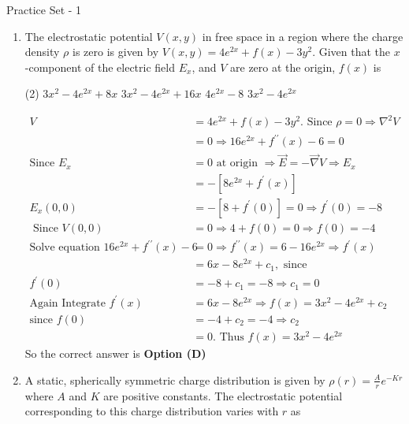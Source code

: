 \begin{abox}
Practice Set - 1
\end{abox}
\begin{enumerate}
	\item  The electrostatic potential $V(x, y)$ in free space in a region where the charge density $\rho$ is zero is given by $V(x, y)=4 e^{2 x}+f(x)-3 y^{2}$. Given that the $x$-component of the electric field $E_{x}$, and $V$ are zero at the origin, $f(x)$ is
	{}
	\begin{tasks}(2)
		\task[\textbf{A.}] $3 x^{2}-4 e^{2 x}+8 x$
		\task[\textbf{B.}] $3 x^{2}-4 e^{2 x}+16 x$
		\task[\textbf{C.}] $4 e^{2 x}-8$
		\task[\textbf{D.}] $3 x^{2}-4 e^{2 x}$
	\end{tasks}
	\begin{answer}
		\begin{align*}
		V&=4 e^{2 x}+f(x)-3 y^{2} .\text{ Since }\rho=0 \Rightarrow \nabla^{2} V\\&=0 \Rightarrow 16 e^{2 x}+f^{\prime \prime}(x)-6=0\\
		\text{Since }E_{x}&=0\text{ at origin }\Rightarrow \vec{E}=-\vec{\nabla} V \Rightarrow E_{x}\\&=-\left[8 e^{2 x}+f^{\prime}(x)\right]\\
		E_{x}(0,0)&=-\left[8+f^{\prime}(0)\right]=0 \Rightarrow f^{\prime}(0)=-8\\
		\text{	Since }V(0,0)&=0 \Rightarrow 4+f(0)=0 \Rightarrow f(0)=-4\\
		\text{Solve equation }16 e^{2 x}+f^{\prime \prime}(x)-6&=0 \Rightarrow f^{\prime \prime}(x)=6-16 e^{2 x} \Rightarrow f^{\prime}(x)\\&=6 x-8 e^{2 x}+c_{1},\text{ since}\\
		f^{\prime}(0)&=-8+c_{1}=-8 \Rightarrow c_{1}=0\\
		\text{Again Integrate }f^{\prime}(x)&=6 x-8 e^{2 x} \Rightarrow f(x)=3 x^{2}-4 e^{2 x}+c_{2}\\
		\text{since }f(0)&=-4+c_{2}=-4 \Rightarrow c_{2}\\&=0.\text{ Thus }f(x)=3 x^{2}-4 e^{2 x}
		\end{align*}
		So the correct answer is \textbf{Option (D)}
	\end{answer}
	\item A static, spherically symmetric charge distribution is given by $\rho(r)=\frac{A}{r} e^{-K r}$ where $A$ and $K$ are positive constants. The electrostatic potential corresponding to this charge distribution varies with $r$ as
	{}

\end{enumerate}

